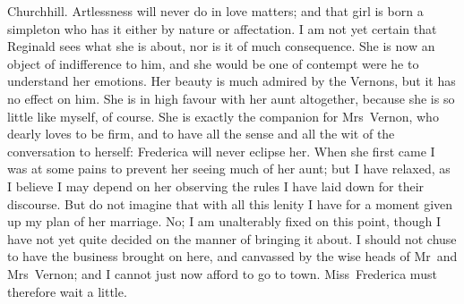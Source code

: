 \begin{mail}{Churchhill.}{}
Artlessness will never do in love matters; and that girl is born a simpleton who has it either by nature or affectation. I am not yet certain that Reginald sees what she is about, nor is it of much consequence. She is now an object of indifference to him, and she would be one of contempt were he to understand her emotions. Her beauty is much admired by the Vernons, but it has no effect on him. She is in high favour with her aunt altogether, because she is so little like myself, of course. She is exactly the companion for Mrs~Vernon, who dearly loves to be firm, and to have all the sense and all the wit of the conversation to herself: Frederica will never eclipse her. When she first came I was at some pains to prevent her seeing much of her aunt; but I have relaxed, as I believe I may depend on her observing the rules I have laid down for their discourse. But do not imagine that with all this lenity I have for a moment given up my plan of her marriage. No; I am unalterably fixed on this point, though I have not yet quite decided on the manner of bringing it about. I should not chuse to have the business brought on here, and canvassed by the wise heads of Mr~and Mrs~Vernon; and I cannot just now afford to go to town. Miss~Frederica must therefore wait a little. 

\end{mail}